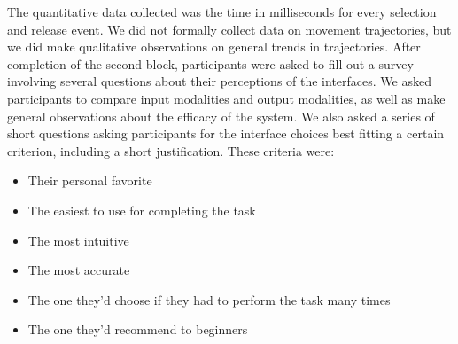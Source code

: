 \documentclass[pageno]{jpaper}
\begin{document}
The quantitative data collected was the time in milliseconds for every selection and release event. We did not formally
collect data on movement trajectories, but we did make qualitative observations on general trends in
trajectories. After completion of the second block, participants were asked to fill out a survey involving several questions
about their perceptions of the interfaces. We asked participants to compare input modalities and output modalities, as well as
make general observations about the efficacy of the system. We also asked a series of short questions asking participants for
the interface choices best fitting a certain criterion, including a short justification. These criteria were:
\begin{itemize}
\item Their personal favorite
\item The easiest to use for completing the task
\item The most intuitive
\item The most accurate
\item The one they'd choose if they had to perform the task many times
\item The one they'd recommend to beginners
\end{itemize}
\end{document}
